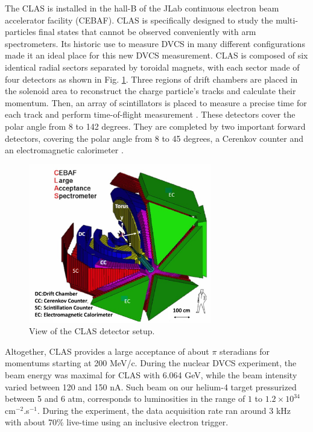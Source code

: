 \documentclass[aps,prc,preprint,superscriptaddress]{revtex4}
\begin{document}
The CLAS \cite{Mecking:2003zu} is installed in the hall-B of the JLab continuous electron beam 
accelerator facility (CEBAF). CLAS is specifically designed to study the multi-particles final states
that cannot be observed conveniently with arm spectrometers. Its historic use to measure DVCS in many different 
configurations made it an ideal place for this new DVCS measurement. CLAS is composed of six identical radial 
sectors separated by toroidal magnets, with each sector made of four detectors 
as shown in Fig. \ref{fig:CLAS}.  Three regions of drift chambers \cite{Mestayer:2000we} 
are placed in the solenoid area to reconstruct the charge particle's tracks and 
calculate their momentum. Then, an array of scintillators is placed to measure 
a precise time for each track and perform time-of-flight measurement 
\cite{Smith:1999ii}. These detectors cover the polar angle from 8 to 142 degrees. 
They are completed by two important forward detectors, covering the polar angle from 8 
to 45 degrees, a Cerenkov counter 
\cite{Adams:2001kk} and an electromagnetic calorimeter \cite{Amarian:2001zs}. 

\begin{figure}[tbp!]
\center
\includegraphics[width=8cm]{fig3/CLAS_geantview-PS.jpg}
	\caption{View of the CLAS detector setup.}
\label{fig:CLAS}
\end{figure}


Altogether, CLAS provides a large acceptance of about $\pi$ steradians for momentums 
starting at 200 MeV/c. During the nuclear DVCS experiment,
the beam energy was maximal for CLAS with 6.064 GeV, while the beam intensity varied
between 120 and 150 nA. Such beam on our helium-4 target pressurized between 5 and 6 atm,
corresponds to luminosities in the range of $1$ to $1.2 \times 10^{34}$ cm$^{-2}$.s$^{-1}$.
During the experiment, the data acquisition rate ran around 3 kHz with about 70\% live-time
using an inclusive electron trigger. 
\end{document}
